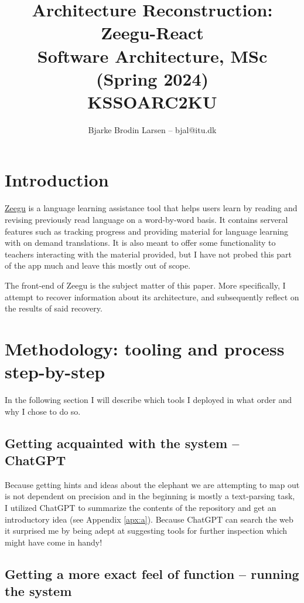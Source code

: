 \documentclass{article}
\title{Architecture Reconstruction: Zeegu-React \\ \normalsize Software Architecture, MSc (Spring 2024) \\ KSSOARC2KU \\}
\author{Bjarke Brodin Larsen -- bjal@itu.dk}
\begin{document}
\maketitle
\tableofcontents

\clearpage
\section{Introduction}

\href{https://zeeguu.com}{Zeegu} is a language learning assistance tool
that helps users learn by reading and revising previously read language on a word-by-word basis.
It contains serveral features such as tracking progress and providing material for language learning
with on demand translations. 
It is also meant to offer some functionality to teachers interacting with the material provided,
but I have not probed this part of the app much and leave this mostly out of scope.

\vspace*{1em}\noindent
The front-end of Zeegu is the subject matter of this paper.
More specifically, I attempt to recover information about its architecture,
and subsequently reflect on the results of said recovery.

\section{Methodology: tooling and process step-by-step}

In the following section I will describe which tools I 
deployed in what order and why I chose to do so.

\subsection{Getting acquainted with the system -- ChatGPT}

Because getting hints and ideas about the elephant we are attempting to 
map out is not dependent on precision and in the beginning is mostly a
text-parsing task, I utilized ChatGPT\cite{gpt4} to summarize the
contents of the repository and get an introductory idea 
(see Appendix \ref{apx:a}).
Because ChatGPT can search the web it surprised me by being adept at 
suggesting tools for further inspection which might have come in handy!

\subsection{Getting a more exact feel of function -- running the system}
\end{document}
